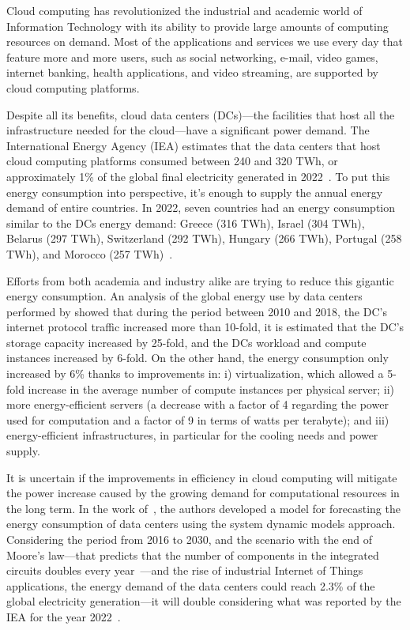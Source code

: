 
Cloud computing has revolutionized the industrial and academic world of Information Technology with its ability to provide large amounts of computing resources on demand. Most of the applications and services we use every day that feature more and more users, such as social networking, e-mail, video games, internet banking, health applications, and video streaming, are supported by cloud computing platforms.

Despite all its benefits, cloud data centers (DCs)---the facilities that host all the infrastructure needed for the cloud---have a significant power demand. The International Energy Agency (IEA) estimates that the data centers that host cloud computing platforms consumed between 240 and 320 TWh, or approximately 1\% of the global final electricity generated in 2022~\cite{IEA_2022}. To put this energy consumption into perspective, it's enough to supply the annual energy demand of entire countries. In 2022, seven countries had an energy consumption similar to the DCs energy demand: Greece (316 TWh), Israel (304 TWh), Belarus (297 TWh), Switzerland (292 TWh), Hungary (266 TWh), Portugal (258 TWh), and Morocco (257 TWh)~\cite{owidenergy}.

Efforts from both academia and industry alike are trying to reduce this gigantic energy consumption. An analysis of the global energy use by data centers performed by \citet{masanet2020recalibrating} showed that during the period between 2010 and 2018, the DC's internet protocol traffic increased more than 10-fold, it is estimated that the DC's storage capacity increased by 25-fold, and the DCs workload and compute instances increased by 6-fold. On the other hand, the energy consumption only increased by 6\% thanks to improvements in: i) virtualization, which allowed a 5-fold increase in the average number of compute instances per physical server; ii) more energy-efficient servers (a decrease with a factor of 4 regarding the power used for computation and a factor of 9 in terms of watts per terabyte); and iii) energy-efficient infrastructures, in particular for the cooling needs and power supply.

It is uncertain if the improvements in efficiency in cloud computing will mitigate the power increase caused by the growing demand for computational resources in the long term. In the work of~\citet{koot2021usage}, the authors developed a model for forecasting the energy consumption of data centers using the system dynamic models approach. Considering the period from 2016 to 2030, and the scenario with the end of Moore's law---that predicts that the number of components in the integrated circuits doubles every year~\cite{Mack_2011_moorelaw}---and the rise of industrial Internet of Things applications, the energy demand of the data centers could reach 2.3\% of the global electricity generation---it will double considering what was reported by the IEA for the year 2022~\cite{IEA_2022}.

